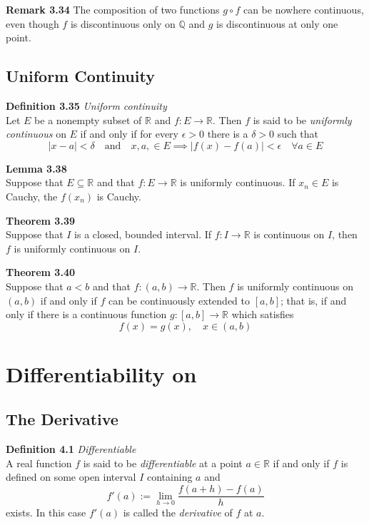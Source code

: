 \documentclass[8pt,landscape]{article}
\begin{document}
\begin{multicols}{3}
    \textbf{Remark 3.34}
    The composition of two functions $g \circ f$ can be nowhere continuous,
    even though $f$ is discontinuous only on $\mathbb{Q}$ and $g$ is discontinuous
    at only one point.

    \subsection{Uniform Continuity}

    \textbf{Definition 3.35} \emph{Uniform continuity} \\
    Let $E$ be a nonempty subset of $\mathbb{R}$ and $f : E \to \mathbb{R}$.
    Then $f$ is said to be \emph{uniformly continuous} on $E$ if and only if
    for every $\epsilon > 0$ there is a $\delta > 0$ such that
    \[
        |x-a| < \delta \quad \text{and} \quad x, a, \in E \implies |f(x) - f(a)| < \epsilon \quad \forall a \in E
    \]

    \textbf{Lemma 3.38} \\
    Suppose that $E \subseteq \mathbb{R}$ and that $f : E \to \mathbb{R}$
    is uniformly continuous.
    If $x_n \in E$ is Cauchy, the $f(x_n)$ is Cauchy.

    \textbf{Theorem 3.39} \\
    Suppose that $I$ is a closed, bounded interval.
    If $f : I \to \mathbb{R}$ is continuous on $I$, then $f$ is uniformly continuous on
    $I$.

    \textbf{Theorem 3.40} \\
    Suppose that $a < b$ and that $f : (a, b) \to \mathbb{R}$.
    Then $f$ is uniformly continuous on $(a, b)$ if and only if $f$ can be continuously
    extended to $[a, b]$; that is, if and only if there is a continuous function
    $g : [a, b] \to \mathbb{R}$ which satisfies
    \[
        f(x) = g(x), \quad x \in (a, b)
    \]

    \section{Differentiability on }

    \subsection{The Derivative}

    \textbf{Definition 4.1} \emph{Differentiable} \\
    A real function $f$ is said to be \emph{differentiable} at a point $a \in \mathbb{R}$
    if and only if $f$ is defined on some open interval $I$ containing $a$ and
    \[
        f'(a) := \lim_{h \to 0} \frac{f(a+h) - f(a)}{h}
    \]
    exists.
    In this case $f'(a)$ is called the \emph{derivative} of $f$ at $a$.


\end{multicols}
\end{document}
